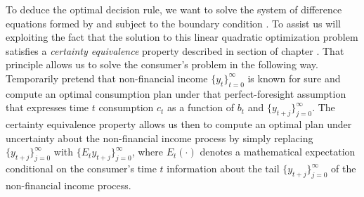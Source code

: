  To deduce the optimal decision rule, we want to solve the system
of difference equations formed by  and  
subject to the boundary condition . 
To assist us 
will exploiting the fact that the solution to this linear quadratic
optimization problem satisfies a {\it certainty equivalence\/} property described in 
section  of  chapter . That principle allows us to solve the consumer's
problem in the following way.
%
 Temporarily  pretend that non-financial income $\{y_t\}_{t=0}^\infty$ is known for sure 
and compute an optimal consumption plan under that perfect-foresight assumption that expresses time $t$ consumption $c_t$ as a function of 
$b_t$ and $\{y_{t+j}\}_{j=0}^\infty$. The certainty equivalence property allows us then to  compute an optimal plan under uncertainty about the non-financial
income process by simply replacing  $\{y_{t+j}\}_{j=0}^\infty$ %
 with  $\{E_t y_{t+j}\}_{j=0}^\infty$, where $E_t(\cdot)$ denotes a mathematical 
expectation conditional on the consumer's time $t$ information about the tail $\{y_{t+j}\}_{j=0}^\infty$
of the non-financial income process.

